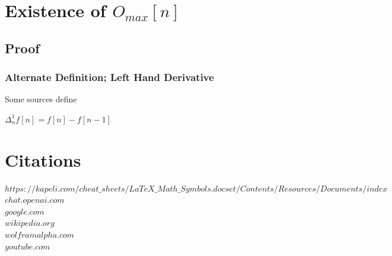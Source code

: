 \documentclass[11pt]{article}
\begin{document}
\section{Existence of $O_{max}[n]$}
\subsection{Proof}


\subsubsection{Alternate Definition; Left Hand Derivative}
Some sources define
\begin{center}
$
\Delta_n^1 f[n] = f[n] - f[n-1]
$
\end{center}


\newpage
\section*{Citations}
\rbrack \hspace{1mm} $https://kapeli.com/cheat\_sheets/LaTeX\_Math\_Symbols.docset/Contents/Resources/Documents/index$\\
\rbrack \hspace{1mm} $chat.openai.com$\\
\rbrack \hspace{1mm} $google.com$\\
\rbrack \hspace{1mm} $wikipedia.org$\\
\rbrack \hspace{1mm} $wolframalpha.com$\\
\rbrack \hspace{1mm} $youtube.com$\\
\end{document}
